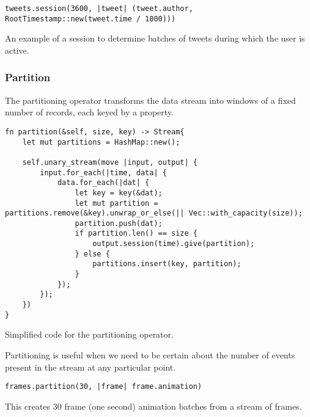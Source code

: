 \begin{listing}[H]
\begin{verbatim}
tweets.session(3600, |tweet| (tweet.author, RootTimestamp::new(tweet.time / 1000)))
\end{verbatim}
\caption{An example of a session to determine batches of tweets during which the user is active.}
\label{lst:session-example}
\end{listing}

\subsubsection{Partition}
The partitioning operator transforms the data stream into windows of a fixed number of records, each keyed by a property.

\begin{listing}[H]
\begin{verbatim}
fn partition(&self, size, key) -> Stream{
    let mut partitions = HashMap::new();

    self.unary_stream(move |input, output| {
        input.for_each(|time, data| {
            data.for_each(|dat| {
                let key = key(&dat);
                let mut partition = partitions.remove(&key).unwrap_or_else(|| Vec::with_capacity(size));
                partition.push(dat);
                if partition.len() == size {
                    output.session(time).give(partition);
                } else {
                    partitions.insert(key, partition);
                }
            });
        });
    })
}
\end{verbatim}
  \caption{Simplified code for the partitioning operator.}
  \label{lst:reduce-to}
\end{listing}

Partitioning is useful when we need to be certain about the number of events present in the stream at any particular point.

\begin{listing}[H]
\begin{verbatim}
frames.partition(30, |frame| frame.animation)
\end{verbatim}
\caption{This creates 30 frame (one second) animation batches from a stream of frames.}
\label{lst:partition-example}
\end{listing}

